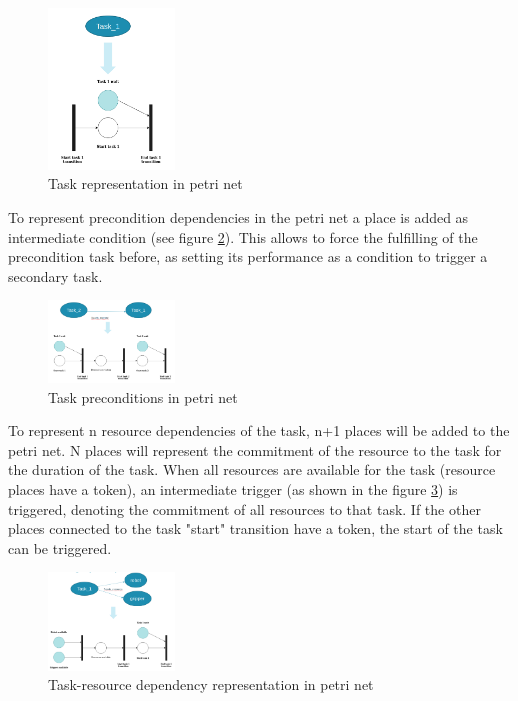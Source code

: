 \documentclass[a4paper,10pt]{article}
\begin{document}
\begin{figure}[h]
    \centering
    \includegraphics[width=0.3\textwidth]{task1_petri.png}
    \caption{Task representation in petri net}
    \label{fig:task1_petri}
\end{figure}


To represent precondition dependencies in the petri net a place is added as intermediate condition (see figure \ref{fig:pre_petri}). This allows to force the fulfilling of the precondition task before, as setting its performance as a condition to trigger a secondary task. 
\begin{figure}[h]
	\centering
	\includegraphics[width=0.3\textwidth]{precondds.png}
	\caption{Task preconditions in petri net}
	\label{fig:pre_petri}
\end{figure}

To represent n resource dependencies of the task, n+1 places will be added to the petri net. N places will represent the commitment of the resource to the task for the duration of the task. When all resources are available for the task (resource places have a token), an intermediate trigger (as shown in the figure \ref{fig:res_petri}) is triggered, denoting the commitment of all resources to that task. If the other places connected to the task "start" transition have a token, the start of the task can be triggered. 

\begin{figure}[h]
	\centering
	\includegraphics[width=0.3\textwidth]{resources_dep.png}
	\caption{Task-resource dependency representation in petri net}
	\label{fig:res_petri}
\end{figure}
\end{document}
